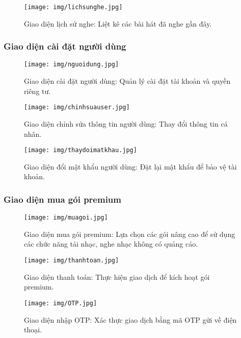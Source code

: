 \documentclass[a4paper,12pt]{article}
\begin{document}
\begin{figure}[H]
  \centering
  \texttt{[image: img/lichsunghe.jpg]}
  \caption{Giao diện lịch sử nghe: Liệt kê các bài hát đã nghe gần đây.}
  \label{fig:lichsunghe}
\end{figure}

\subsubsection{Giao diện cài đặt người dùng}
\begin{figure}[H]
  \centering
  \texttt{[image: img/nguoidung.jpg]}
  \caption{Giao diện cài đặt người dùng: Quản lý cài đặt tài khoản và quyền riêng tư.}
  \label{fig:nguoidung}
\end{figure}

\begin{figure}[H]
  \centering
  \texttt{[image: img/chinhsuauser.jpg]}
  \caption{Giao diện chỉnh sửa thông tin người dùng: Thay đổi thông tin cá nhân.}
  \label{fig:chinhsuauser}
\end{figure}

\begin{figure}[H]
  \centering
  \texttt{[image: img/thaydoimatkhau.jpg]}
  \caption{Giao diện đổi mật khẩu người dùng: Đặt lại mật khẩu để bảo vệ tài khoản.}
  \label{fig:thaydoimatkhau}
\end{figure}

\subsubsection{Giao diện mua gói premium}
\begin{figure}[H]
  \centering
  \texttt{[image: img/muagoi.jpg]}
  \caption{Giao diện mua gói premium: Lựa chọn các gói nâng cao để sử dụng các chức năng tải nhạc, nghe nhạc không có quảng cáo.}
  \label{fig:muagoi}
\end{figure}

\begin{figure}[H]
  \centering
  \texttt{[image: img/thanhtoan.jpg]}
  \caption{Giao diện thanh toán: Thực hiện giao dịch để kích hoạt gói premium.}
  \label{fig:thanhtoan}
\end{figure}

\begin{figure}[H]
  \centering
  \texttt{[image: img/OTP.jpg]}
  \caption{Giao diện nhập OTP: Xác thực giao dịch bằng mã OTP gửi về điện thoại.}
  \label{fig:otp}
\end{figure}
\end{document}
